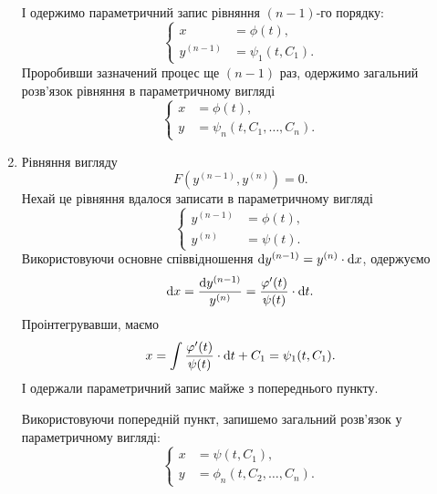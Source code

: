 \begin{enumerate}
І одержимо параметричний запис рівняння $(n-1)$-го порядку:
\begin{equation*}
	\left\{
		\begin{aligned}
			x &= \phi(t), \\
			y^{(n-1)} &= \psi_1(t, C_1).
		\end{aligned}
	\right.
\end{equation*}
Проробивши зазначений процес ще $(n-1)$ раз, одержимо загальний розв’язок рівняння в параметричному вигляді
\begin{equation*}
	\left\{
		\begin{aligned}
			x &= \phi(t), \\
			y &= \psi_n(t, C_1, \ldots, C_n).
		\end{aligned}
	\right.
\end{equation*}
 
\item Рівняння вигляду
\begin{equation*}
	F \left( y^{(n-1)}, y^{(n)} \right) = 0.
\end{equation*}
Нехай це рівняння вдалося записати в параметричному вигляді 
\begin{equation*}
	\left\{
		\begin{aligned}
			y^{(n-1)} &= \phi(t), \\
			y^{(n)} &= \psi(t).
		\end{aligned}
	\right.
\end{equation*}
Використовуючи основне співвідношення $\mathop{}\!\mathrm{d} y^{(n-1)} = y^{(n)} \cdot \mathop{}\!\mathrm{d} x$, одержуємо
\begin{equation*}
	\mathop{}\!\mathrm{d} x = \frac{\mathop{}\!\mathrm{d} y^{(n-1)}}{y^{(n)}} = \frac{\varphi'(t)}{\psi(t)} \cdot \mathop{}\!\mathrm{d} t.
\end{equation*}
Проінтегрувавши, маємо
\begin{equation*}
	x = \int \frac{\varphi'(t)}{\psi(t)} \cdot \mathop{}\!\mathrm{d} t + C_1 = \psi_1(t, C_1).
\end{equation*}
І одержали параметричний запис майже з попереднього пункту. \parvskip

Використовуючи попередній пункт, запишемо загальний розв’язок у параметричному вигляді:
\begin{equation*}
	\left\{
		\begin{aligned}
			x &= \psi(t, C_1), \\
			y &= \phi_n(t, C_2, \ldots, C_n).
		\end{aligned}
	\right.
\end{equation*}
 

\end{enumerate}
